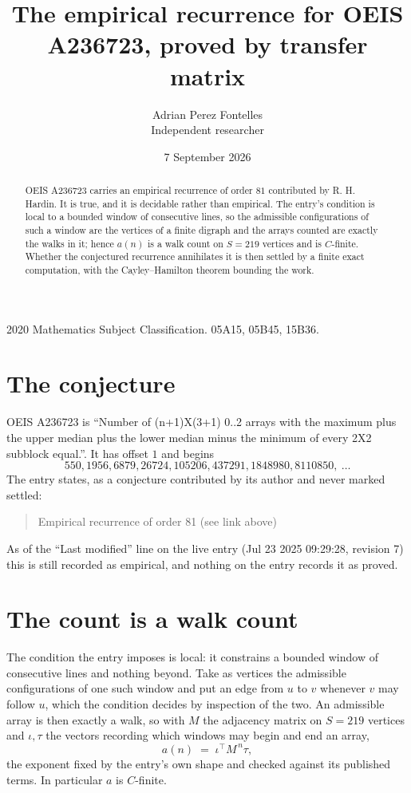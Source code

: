 \documentclass[11pt,a4paper]{article}
\title{The empirical recurrence for OEIS A236723, proved by transfer matrix}
\author{Adrian Perez Fontelles\\ \small Independent researcher}
\date{7 September 2026}
\theoremstyle{plain}
\theoremstyle{definition}
\begin{document}
\maketitle

\begin{abstract}
OEIS A236723 carries an empirical recurrence of order $81$ contributed by R. H. Hardin. It is
true, and it is decidable rather than empirical. The entry's condition is local to a bounded window of consecutive lines, so
the admissible configurations of such a window are the vertices of a finite digraph and the
arrays counted are exactly the walks in it; hence $a(n)$ is a walk count on $S=219$ vertices
and is $C$-finite. Whether the conjectured recurrence annihilates it is then settled by a
finite exact computation, with the Cayley--Hamilton theorem bounding the work.
\end{abstract}

\noindent\small 2020 Mathematics Subject Classification. 05A15, 05B45, 15B36.\normalsize

\section{The conjecture}

OEIS A236723 is ``Number of (n+1)X(3+1) 0..2 arrays with the maximum plus the upper median plus the lower median minus the minimum of every 2X2 subblock equal.''. It has offset $1$ and begins
\[
550, 1956, 6879, 26724, 105206, 437291, 1848980, 8110850,\ \dots
\]
The entry states, as a conjecture contributed by its author and never marked settled:
\begin{quote}
Empirical recurrence of order 81 (see link above)
\end{quote}
As of the ``Last modified'' line on the live entry (Jul 23 2025 09:29:28, revision 7) this is still
recorded as empirical, and nothing on the entry records it as proved.

\section{The count is a walk count}

The condition the entry imposes is local: it constrains a bounded window of consecutive lines and nothing beyond. Take as
vertices the admissible configurations of one such window and put an edge from $u$ to $v$
whenever $v$ may follow $u$, which the condition decides by inspection of the two. An
admissible array is then exactly a walk, so with $M$ the adjacency matrix on $S=219$ vertices
and $\iota,\tau$ the vectors recording which windows may begin and end an array,
\[
a(n)\;=\;\iota^{\!\top}M^{\,n}\tau ,
\]
the exponent fixed by the entry's own shape and checked against its published terms. In
particular $a$ is $C$-finite.
\end{document}
